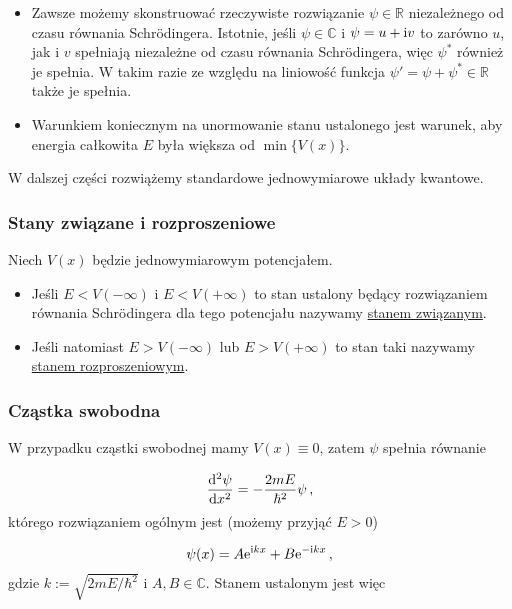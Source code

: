 \documentclass{myclass}
\begin{document}
\begin{itemize}
    \item Zawsze możemy skonstruować rzeczywiste rozwiązanie \(\psi\in\mathbb{R}\) niezależnego od
    czasu równania Schr{\"o}dingera. Istotnie, jeśli \(\psi\in\mathbb{C}\) i \(\psi=u+\mathrm{i} v\) to
    zarówno \(u\), jak i \(v\) spełniają niezależne od czasu równania Schr{\"o}dingera, więc
    \(\psi^*\) również je spełnia. W takim razie ze względu na liniowość funkcja
    \(\psi'=\psi+\psi^*\in\mathbb{R}\) także je spełnia.
    
    \item Warunkiem koniecznym na unormowanie stanu ustalonego jest warunek, aby energia całkowita
    \(E\) była większa od \(\min\{V(x)\}\).

\end{itemize}

W dalszej części rozwiążemy standardowe jednowymiarowe układy kwantowe.

\subsubsection{Stany związane i rozproszeniowe}

Niech \(V(x)\) będzie jednowymiarowym potencjałem.

\begin{itemize}
    \item Jeśli \(E<V(-\infty)\) i \(E<V(+\infty)\) to stan ustalony będący rozwiązaniem równania
    Schr{\"o}dingera dla tego potencjału nazywamy \underline{stanem związanym}.
    
    \item Jeśli natomiast \(E>V(-\infty)\) lub \(E>V(+\infty)\) to stan taki nazywamy
    \underline{stanem rozproszeniowym}.
\end{itemize}

\subsubsection{Cząstka swobodna}

W przypadku cząstki swobodnej mamy \(V(x)\equiv 0\), zatem \(\psi\) spełnia równanie

\begin{equation*}
    \dv[2]{\psi}{x}=-\frac{2mE}{\hbar^2}\psi\,,
\end{equation*}
którego rozwiązaniem ogólnym jest (możemy przyjąć \(E>0\))

\begin{equation*}
    \psi(x)=A\mathrm{e}^{\mathrm{i} kx}+B\mathrm{e}^{-\mathrm{i} kx}\,,
\end{equation*}
gdzie \(k:=\sqrt{2mE/\hbar^2}\) i \(A,B\in\mathbb{C}\). Stanem ustalonym jest więc
\end{document}
